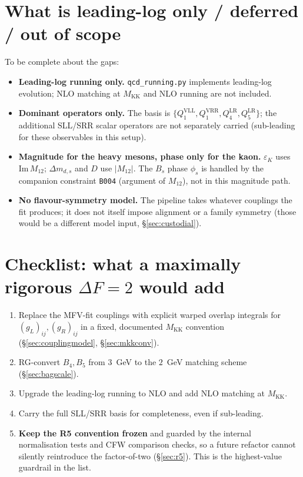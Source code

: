 \documentclass[11pt]{article}
\newcommand{\MKK}{M_{\mathrm{KK}}}
\newcommand{\eps}{\varepsilon}
\newcommand{\Mtwelve}{M_{12}}
\newcommand{\ImMtwelve}{\mathrm{Im}\,M_{12}}
\newcommand{\QVLL}{Q_1^{\mathrm{VLL}}}
\newcommand{\QVRR}{Q_1^{\mathrm{VRR}}}
\newcommand{\QLRfour}{Q_4^{\mathrm{LR}}}
\newcommand{\QLRfive}{Q_5^{\mathrm{LR}}}
\newcommand{\code}[1]{\texttt{#1}}
\theoremstyle{definition}
\begin{document}
\section{What is leading-log only / deferred / out of scope}
\label{sec:deferred}

To be complete about the gaps:
\begin{itemize}[leftmargin=1.4em]
\item \textbf{Leading-log running only.} \code{qcd\_running.py} implements
leading-log evolution; NLO matching at $\MKK$ and NLO running are not included.
\item \textbf{Dominant operators only.} The basis is
$\{\QVLL,\QVRR,\QLRfour,\QLRfive\}$; the additional SLL/SRR scalar operators are
not separately carried (sub-leading for these observables in this setup).
\item \textbf{Magnitude for the heavy mesons, phase only for the kaon.} $\eps_K$
uses $\ImMtwelve$; $\Delta m_{d,s}$ and $D$ use $|\Mtwelve|$. The $B_s$ phase
$\phi_s$ is handled by the companion constraint \code{B004} (argument of
$\Mtwelve$), not in this magnitude path.
\item \textbf{No flavour-symmetry model.} The pipeline takes whatever couplings the
fit produces; it does not itself impose alignment or a family symmetry (those would
be a different model input, \S\ref{sec:custodial}).
\end{itemize}

\section{Checklist: what a maximally rigorous $\Delta F=2$ would add}
\begin{enumerate}[leftmargin=1.8em]
\item Replace the MFV-fit couplings with explicit warped overlap integrals for
$(g_L)_{ij},(g_R)_{ij}$ in a fixed, documented $\MKK$ convention
(\S\ref{sec:couplingmodel}, \S\ref{sec:mkkconv}).
\item RG-convert $B_4,B_5$ from $3$~GeV to the $2$~GeV matching scheme
(\S\ref{sec:bagscale}).
\item Upgrade the leading-log running to NLO and add NLO matching at $\MKK$.
\item Carry the full SLL/SRR basis for completeness, even if sub-leading.
\item \textbf{Keep the R5 convention frozen} and guarded by the internal
normalisation tests and CFW comparison checks, so a future refactor cannot
silently reintroduce the factor-of-two
(\S\ref{sec:r5}). This is the highest-value guardrail in the list.
\end{enumerate}
\end{document}
